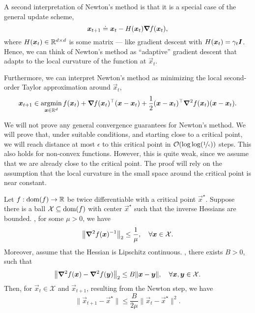 A second interpretation of Newton's method is that it is a special case of the general update
scheme, \[
    \bm{x}_{t+1} \doteq \bm{x}_t - H(\bm{x}_t) \bm{\nabla}_{\! } f(\bm{x}_t),
\]
where $H(\bm{x}_t) \in \mathbb{R}^{d \times d}$ is some matrix --- like gradient descent with
$H(\bm{x}_t) = \gamma_t \bm{I}$. Hence, we can think of Newton's method as ``adaptive'' gradient
descent that adapts to the local curvature of the function at $\vec{x}_t$.

Furthermore, we can interpret Newton's method as minimizing the local second-order Taylor
approximation around $\vec{x}_t$, \[
    \bm{x}_{t+1} \in \operatorname*{argmin}_{\bm{x} \in \mathbb{R}^d} f(\bm{x}_t) + \bm{\nabla}_{\! } f(\bm{x}_t)^\top(\bm{x} - \bm{x}_t) + \frac{1}{2} (\bm{x} - \bm{x}_t)^\top \bm{\nabla}^2_{\! } f(\bm{x}_t)(\bm{x} - \bm{x}_t).
\]

We will not prove any general convergence guarantees for Newton's method. We will prove that, under
suitable conditions, and starting close to a critical point, we will reach distance at most
$\epsilon$ to this critical point in $\bigo{\log \log(\nicefrac{1}{\epsilon})}$ steps. This also
holds for non-convex functions. However, this is quite weak, since we assume that we are already
close to the critical point. The proof will rely on the assumption that the local curvature in the
small space around the critical point is near constant.

\begin{theorem} \label{thm:newton}
    Let $f: \mathrm{dom}(f) \to \mathbb{R}$ be twice differentiable with a critical point $\vec{x}^\star$. Suppose
    there is a ball $\mathcal{X} \subseteq \mathrm{dom}(f)$ with center $\vec{x}^\star$ such that the inverse
    Hessians are bounded. \Ie, for some $\mu > 0$, we have \[
        \lft\| \inv{\hess{f(\vec{x})}{}} \rgt\|_2 \leq \frac{1}{\mu}, \quad \forall \vec{x} \in \mathcal{X}.
    \]
    Moreover, assume that the Hessian is Lipschitz continuous. \Ie, there exists $B > 0$, such that \[
        \lft\| \hess{f(\vec{x})}{} - \hess{f(\vec{y})}{} \rgt\|_2 \leq B \| \vec{x} - \vec{y} \|, \quad \forall \vec{x},\vec{y}\in \mathcal{X}.
    \]
    Then, for $\vec{x}_t \in \mathcal{X}$ and $\vec{x}_{t+1}$, resulting from the Newton step, we have \[
        \| \vec{x}_{t+1} - \vec{x}^\star \| \leq \frac{B}{2 \mu} \| \vec{x}_t - \vec{x}^\star \|^2.
    \]
\end{theorem}

